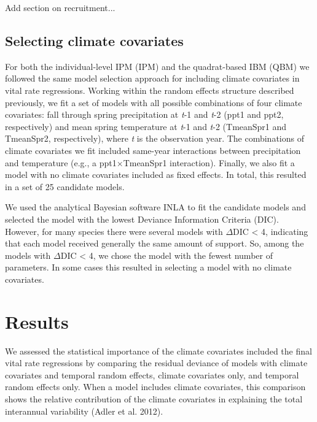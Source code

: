 \documentclass[12pt]{article}
\begin{document}
Add section on recruitment...

\subsection{Selecting climate covariates}
For both the individual-level IPM (IPM) and the quadrat-based IBM (QBM) we followed the same model selection approach for including climate covariates in vital rate regressions.  Working within the random effects structure described previously, we fit a set of models with all possible combinations of four climate covariates: fall through spring precipitation at \emph{t}-1 and \emph{t}-2 (ppt1 and ppt2, respectively) and mean spring temperature at \emph{t}-1 and \emph{t}-2 (TmeanSpr1 and TmeanSpr2, respectively), where \emph{t} is the observation year. The combinations of climate covariates we fit included same-year interactions between precipitation and temperature (e.g., a ppt1$\times$TmeanSpr1 interaction). Finally, we also fit a model with no climate covariates included as fixed effects. In total, this resulted in a set of 25 candidate models.

We used the analytical Bayesian software INLA to fit the candidate models and selected the model with the lowest Deviance Information Criteria (DIC). However, for many species there were several models with $\Delta$DIC < 4, indicating that each model received generally the same amount of support. So, among the models with $\Delta$DIC < 4, we chose the model with the fewest number of parameters. In some cases this resulted in selecting a model with no climate covariates.

\section{Results}
We assessed the statistical importance of the climate covariates included the final vital rate regressions by comparing the residual deviance of models with climate covariates and temporal random effects, climate covariates only, and temporal random effects only. When a model includes climate covariates, this comparison shows the relative contribution of the climate covariates in explaining the total interannual variability (Adler et al. 2012). 
\end{document}
